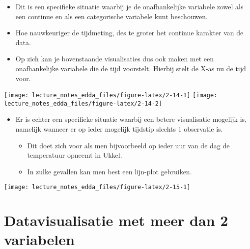 \documentclass[]{memoir}
\providecommand{\tightlist}{%
  \setlength{\itemsep}{0pt}\setlength{\parskip}{0pt}}
\begin{document}
\begin{itemize}
\tightlist
\item
  Dit is een specifieke situatie waarbij je de onafhankelijke variabele zowel als een continue en als een categorische variabele kunt beschouwen.
\item
  Hoe nauwkeuriger de tijdmeting, des te groter het continue karakter van de data.
\item
  Op zich kan je bovenstaande visualisaties dus ook maken met een onafhankelijke variabele die de tijd voorstelt. Hierbij stelt de X-as nu de tijd voor.
\end{itemize}

\texttt{[image: lecture\_notes\_edda\_files/figure-latex/2-14-1]}
\texttt{[image: lecture\_notes\_edda\_files/figure-latex/2-14-2]}

\begin{itemize}
\tightlist
\item
  Er is echter een specifieke situatie waarbij een betere visualisatie mogelijk is, namelijk wanneer er op ieder mogelijk tijdstip slechts 1 observatie is.

  \begin{itemize}
  \tightlist
  \item
    Dit doet zich voor als men bijvoorbeeld op ieder uur van de dag de temperatuur opneemt in Ukkel.
  \item
    In zulke gevallen kan men best een lijn-plot gebruiken.
  \end{itemize}
\end{itemize}

\texttt{[image: lecture\_notes\_edda\_files/figure-latex/2-15-1]}

\hypertarget{datavisualisatie-met-meer-dan-2-variabelen}{%
\section{Datavisualisatie met meer dan 2 variabelen}\label{datavisualisatie-met-meer-dan-2-variabelen}}
\end{document}

